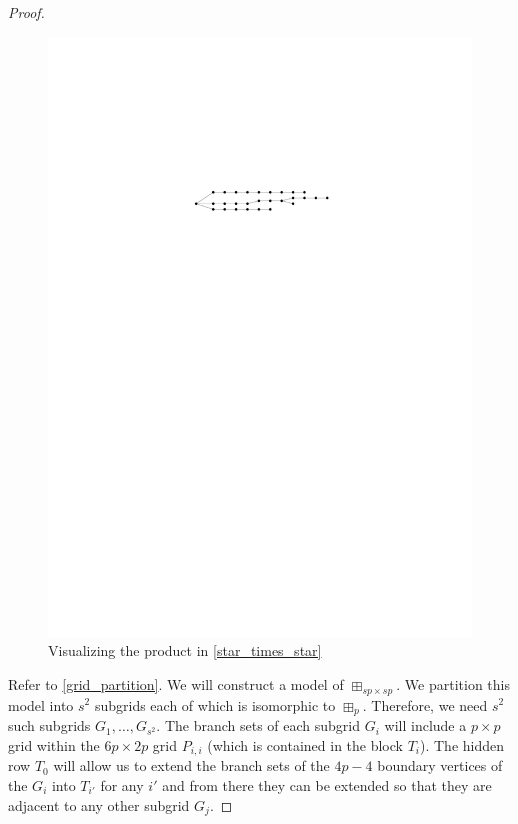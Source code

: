 \documentclass[kpfonts,lotsofwhite]{patmorin}
\theoremstyle{plain}
\theoremstyle{definition}
\begin{document}
\begin{proof}
  \begin{figure}
    \begin{center}
      \includegraphics[page=4]{figs/product}
    \end{center}
    \caption{Visualizing the product in \cref{star_times_star}}
    \label{product_fig}
  \end{figure}

  Refer to \cref{grid_partition}.  We will construct a model of $\boxplus_{sp\times sp}$.  We partition this model into $s^2$ subgrids each of which is isomorphic to $\boxplus_p$.  Therefore, we need $s^2$ such subgrids $G_1,\ldots,G_{s^2}$. The branch sets of each subgrid $G_i$ will include a $p\times p$ grid within the $6p\times 2p$ grid $P_{i,i}$ (which is contained in the block $T_i$).  The hidden row $T_0$ will allow us to extend the branch sets of the $4p-4$ boundary vertices of the $G_i$ into $T_{i'}$ for any $i'$ and from there they can be extended so that they are adjacent to any other subgrid $G_j$.


\end{proof}
\end{document}

